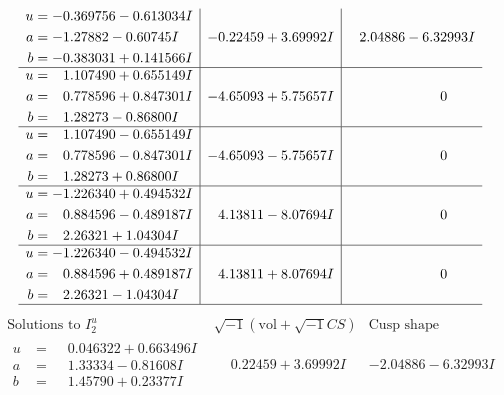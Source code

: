 \documentclass[1p]{elsarticle_modified}
\theoremstyle{definition}
\newcommand{\I}{\sqrt{-1}}
\begin{document}
$$\begin{array}{c|c|c}
\begin{aligned}
u &= -0.369756 - 0.613034 I \\
a &= -1.27882 - 0.60745 I \\
b &= -0.383031 + 0.141566 I\end{aligned}
 & -0.22459 + 3.69992 I & \phantom{-}2.04886 - 6.32993 I \\ \hline\begin{aligned}
u &= \phantom{-}1.107490 + 0.655149 I \\
a &= \phantom{-}0.778596 + 0.847301 I \\
b &= \phantom{-}1.28273 - 0.86800 I\end{aligned}
 & -4.65093 + 5.75657 I & \phantom{-0.000000 } 0 \\ \hline\begin{aligned}
u &= \phantom{-}1.107490 - 0.655149 I \\
a &= \phantom{-}0.778596 - 0.847301 I \\
b &= \phantom{-}1.28273 + 0.86800 I\end{aligned}
 & -4.65093 - 5.75657 I & \phantom{-0.000000 } 0 \\ \hline\begin{aligned}
u &= -1.226340 + 0.494532 I \\
a &= \phantom{-}0.884596 - 0.489187 I \\
b &= \phantom{-}2.26321 + 1.04304 I\end{aligned}
 & \phantom{-}4.13811 - 8.07694 I & \phantom{-0.000000 } 0 \\ \hline\begin{aligned}
u &= -1.226340 - 0.494532 I \\
a &= \phantom{-}0.884596 + 0.489187 I \\
b &= \phantom{-}2.26321 - 1.04304 I\end{aligned}
 & \phantom{-}4.13811 + 8.07694 I & \phantom{-0.000000 } 0\\
 \hline 
 \end{array}$$\newpage$$\begin{array}{c|c|c}  
\text{Solutions to }I^u_{2}& \I (\text{vol} + \sqrt{-1}CS) & \text{Cusp shape}\\
 \hline 
\begin{aligned}
u &= \phantom{-}0.046322 + 0.663496 I \\
a &= \phantom{-}1.33334 - 0.81608 I \\
b &= \phantom{-}1.45790 + 0.23377 I\end{aligned}
 & \phantom{-}0.22459 + 3.69992 I & -2.04886 - 6.32993 I \\ \hline\begin{aligned}

\end{aligned}
\end{array}$$
\end{document}
